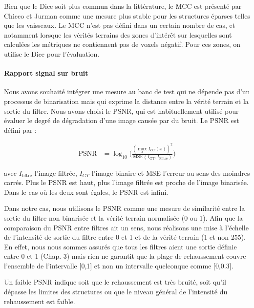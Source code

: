 Bien que le Dice soit plus commun dans la littérature, le MCC est présenté par Chicco et Jurman \cite{Chicco2020_advantages_MCC_Dice} comme une mesure plus stable pour les structures éparses telles que les vaisseaux. Le MCC n'est pas défini dans un certain nombre de cas, et notamment lorsque les vérités terrains des zones d'intérêt sur lesquelles sont calculées les métriques ne contiennent pas de voxels négatif. Pour ces zones, on utilise le Dice pour l'évaluation. 

\paragraph{Rapport signal sur bruit}


Nous avons souhaité intégrer une mesure au banc de test qui ne dépende pas d'un processus de binarisation mais qui exprime la distance entre la vérité terrain et la sortie du filtre. Nous avons choisi le PSNR, qui est habituellement utilisé pour évaluer le degré de dégradation d'une image causée par du bruit. Le PSNR est défini par :

\begin{align}%
 \nonumber
  \textrm{PSNR} & = \log_{10}\Big( \frac{ (\max_x I_{GT}(x))^2  }{ \textrm{MSE}( I_{\textrm{GT}}, I_{\textrm{Filtre}} ) } \Big)
\end{align}

avec $I_{\textrm{filtre}}$ l'image filtrée, $I_{GT}$ l'image binaire et MSE l'erreur au sens des moindres carrés. Plus le PSNR est haut, plus l'image filtrée est proche de l'image binarisée. Dans le cas où les deux sont égales, le PSNR est infini.

Dans notre cas, nous utilisons le PSNR comme une mesure de similarité entre la sortie du filtre non binarisée et la vérité terrain normalisée (0 ou 1). Afin que la comparaison du PSNR entre filtres ait un sens, nous réalisons une mise à l'échelle de l'intensité de sortie du filtre entre 0 et 1 et de la vérité terrain (1 et non 255). En effet, nous nous sommes assurés que tous les filtres aient une sortie définie entre 0 et 1 (Chap. 3) mais rien ne garantit que la plage de rehaussement couvre l'ensemble de l'intervalle [0,1] et non un intervalle quelconque comme [0,0.3].

Un faible PSNR indique soit que le rehaussement est très bruité, soit qu'il dépasse les limites des structures ou que le niveau général de l'intensité du rehaussement est faible.

